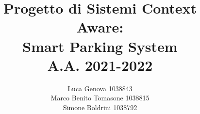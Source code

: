 \documentclass[12pt, a4paper]{report}
\author{Luca Genova  1038843\\ 
Marco Benito Tomasone 1038815\\
Simone Boldrini 1038792\\}
\title{Progetto di Sistemi Context Aware:\\
Smart Parking System\\
A.A. 2021-2022}
\begin{document}
\maketitle
\tableofcontents












\nocite{*}
\end{document}
